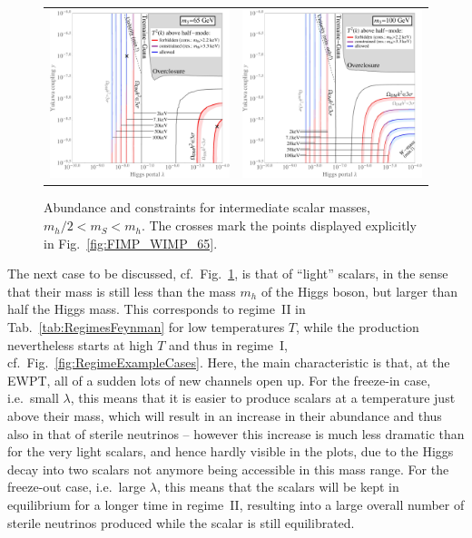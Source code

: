 \begin{figure}[t]
\begin{tabular}{lr}\hspace{-1cm}
 \includegraphics[width=8.3cm]{figures/HalfMode_65_until4.jpeg} & \includegraphics[width=8.3cm]{figures/HalfMode_100_until4.jpeg}
\end{tabular}
\caption{\label{fig:small_masses}Abundance and constraints for intermediate scalar masses, $m_h/2 < m_S < m_h$. The crosses mark the points displayed explicitly in Fig.~\ref{fig:FIMP_WIMP_65}.}
\end{figure}

The next case to be discussed, cf.\ Fig.~\ref{fig:small_masses}, is that of ``light'' scalars, in the sense that their mass is still less than the mass $m_h$ of the Higgs boson, but larger than half the Higgs mass. This corresponds to regime~II in Tab.~\ref{tab:RegimesFeynman} for low temperatures $T$, while the production nevertheless starts at high $T$ and thus in regime~I, cf.\ Fig.~\ref{fig:RegimeExampleCases}. Here, the main characteristic is that, at the EWPT, all of a sudden lots of new channels open up. For the freeze-in case, i.e.\ small $\lambda$, this means that it is easier to produce scalars at a temperature just above their mass, which will result in an increase in their abundance and thus also in that of sterile neutrinos -- however this increase is much less dramatic than for the very light scalars, and hence hardly visible in the plots, due to the Higgs decay into two scalars not anymore being accessible in this mass range. For the freeze-out case, i.e.\ large $\lambda$, this means that the scalars will be kept in equilibrium for a longer time in regime~II, resulting into a large overall number of sterile neutrinos produced while the scalar is still equilibrated.

